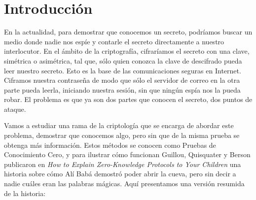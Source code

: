 \chapter{Introducción}\label{ch:introduction}

En la actualidad, para demostrar que conocemos un secreto, podríamos buscar un medio donde nadie nos espíe y contarle el secreto directamente a nuestro interlocutor. En el ámbito de la criptografía, cifraríamos el secreto con una clave, simétrica o asimétrica, tal que, sólo quien conozca la clave de descifrado pueda leer nuestro secreto. Esto es la base de las comunicaciones seguras en Internet. Ciframos nuestra contraseña de modo que sólo el servidor de correo en la otra parte pueda leerla, iniciando nuestra sesión, sin que ningún espía nos la pueda robar. El problema es que ya son dos partes que conocen el secreto, dos puntos de ataque.

Vamos a estudiar una rama de la criptología que se encarga de abordar este problema, demostrar que conocemos algo, pero sin que de la misma prueba se obtenga más información. Estos métodos se conocen como Pruebas de Conocimiento Cero, y para ilustrar cómo funcionan Guillou, Quisquater y Berson publicaron en \textit{How to Explain Zero-Knowledge Protocols to Your Children} \citep{ZKPcave:story} una historia sobre cómo Alí Babá demostró poder abrir la cueva, pero sin decir a nadie cuáles eran las palabras mágicas. Aquí presentamos una versión resumida de la historia:

\hfil

